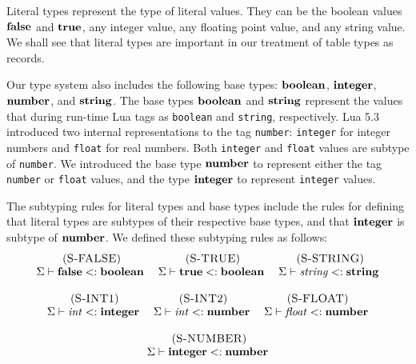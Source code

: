 Literal types represent the type of literal values.
They can be the boolean values $\mathbf{false}$ and $\mathbf{true}$,
any integer value, any floating point value, and any string value.
We shall see that literal types are important in our treatment of
table types as records.

Our type system also includes the following base types: $\mathbf{boolean}$,
$\mathbf{integer}$, $\mathbf{number}$, and $\mathbf{string}$.
The base types $\mathbf{boolean}$ and $\mathbf{string}$ represent the values that during
run-time Lua tags as \texttt{boolean} and \texttt{string}, respectively.
Lua 5.3 introduced two internal representations to the tag \texttt{number}:
\texttt{integer} for integer numbers and \texttt{float} for real numbers.
Both \texttt{integer} and \texttt{float} values are subtype of \texttt{number}.
We introduced the base type $\mathbf{number}$ to represent either the tag
\texttt{number} or \texttt{float} values, and the type $\mathbf{integer}$ to represent
\texttt{integer} values.

The subtyping rules for literal types and base types include the rules
for defining that literal types are subtypes of their respective base types,
and that $\mathbf{integer}$ is subtype of $\mathbf{number}$.
We defined these subtyping rules as follows:
\[
\begin{array}{c}
\begin{array}{c}
\; (\textsc{S-FALSE})\\
\Sigma \vdash \mathbf{false} <: \mathbf{boolean}
\end{array}
\;
\begin{array}{c}
\; (\textsc{S-TRUE})\\
\Sigma \vdash \mathbf{true} <: \mathbf{boolean}
\end{array}
\;
\begin{array}{c}
\; (\textsc{S-STRING})\\
\Sigma \vdash {\it string} <: \mathbf{string}
\end{array}
\\ \\
\begin{array}{c}
\; (\textsc{S-INT1})\\
\Sigma \vdash {\it int} <: \mathbf{integer}
\end{array}
\;
\begin{array}{c}
\; (\textsc{S-INT2})\\
\Sigma \vdash {\it int} <: \mathbf{number}
\end{array}
\;
\begin{array}{c}
\; (\textsc{S-FLOAT})\\
\Sigma \vdash {\it float} <: \mathbf{number}
\end{array}
\\ \\
\begin{array}{c}
\; (\textsc{S-NUMBER})\\
\Sigma \vdash \mathbf{integer} <: \mathbf{number}
\end{array}
\end{array}
\]

